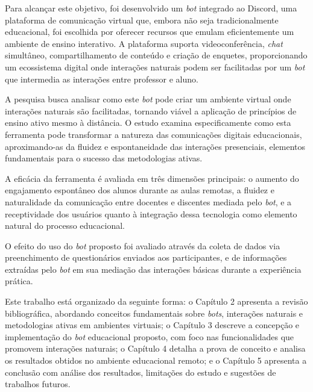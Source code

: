 Para alcançar este objetivo, foi desenvolvido um \textit{bot} integrado ao
Discord, uma plataforma de comunicação virtual que, embora não seja
tradicionalmente educacional, foi escolhida por oferecer recursos que emulam
eficientemente um ambiente de ensino interativo. A plataforma suporta
videoconferência, \textit{chat} simultâneo, compartilhamento de conteúdo e
criação de enquetes, proporcionando um ecossistema digital onde interações
naturais podem ser facilitadas por um \textit{bot} que intermedia as interações
entre professor e aluno.

A pesquisa busca analisar como este \textit{bot} pode criar um ambiente virtual
onde interações naturais são facilitadas, tornando viável a aplicação de
princípios de ensino ativo mesmo à distância. O estudo examina especificamente
como esta ferramenta pode transformar a natureza das comunicações digitais
educacionais, aproximando-as da fluidez e espontaneidade das interações
presenciais, elementos fundamentais para o sucesso das metodologias ativas.

A eficácia da ferramenta é avaliada em três dimensões principais: o aumento do
engajamento espontâneo dos alunos durante as aulas remotas, a fluidez e
naturalidade da comunicação entre docentes e discentes mediada pelo
\textit{bot}, e a receptividade dos usuários quanto à integração dessa
tecnologia como elemento natural do processo educacional.

O efeito do uso do \textit{bot} proposto foi avaliado através da coleta de dados
via preenchimento de questionários enviados aos participantes, e de informações
extraídas pelo \textit{bot} em sua mediação das interações básicas durante a
experiência prática.

Este trabalho está organizado da seguinte forma: o Capítulo 2 apresenta a
revisão bibliográfica, abordando conceitos fundamentais sobre \textit{bots},
interações naturais e metodologias ativas em ambientes virtuais; o Capítulo 3
descreve a concepção e implementação do \textit{bot} educacional proposto, com
foco nas funcionalidades que promovem interações naturais; o Capítulo 4 detalha
a prova de conceito e analisa os resultados obtidos no ambiente educacional
remoto; e o Capítulo 5 apresenta a conclusão com análise dos resultados,
limitações do estudo e sugestões de trabalhos futuros.
